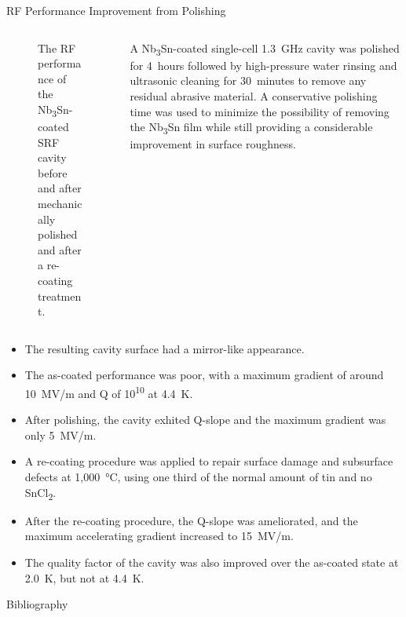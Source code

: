 \documentclass{beamer}
\begin{document}
\begin{frame}{}
\begin{columns}[t]
\begin{column}{0.32\textwidth}
\begin{block}{\label{sec:cavitycbp}RF Performance Improvement from Polishing}
\begin{columns}
\begin{column}{0.45\columnwidth}
\begin{figure}[t]
                                \caption{\label{fig:vtstestgraph}The RF performance of the Nb\textsubscript{3}Sn-coated SRF cavity before and after mechanically polished and after a re-coating treatment.}
                            \end{figure}
                        \end{column}
                        \begin{column}{0.5\columnwidth}
                            A Nb\textsubscript{3}Sn-coated single-cell 1.3~GHz cavity was polished for 4~hours followed by high-pressure water rinsing and ultrasonic cleaning for 30~minutes to remove any residual abrasive material. A conservative polishing time was used to minimize the possibility of removing the Nb\textsubscript{3}Sn film while still providing a considerable improvement in surface roughness.
                        \end{column}
                    \end{columns}   
                    \begin{itemize}
                        \item The resulting cavity surface had a mirror-like appearance.
                        \item The as-coated performance was poor, with a maximum gradient of around 10~MV/m and Q of 10\textsuperscript{10} at 4.4~K.
                        \item After polishing, the cavity exhited Q-slope and the maximum gradient was only 5~MV/m.
                        \item A re-coating procedure was applied to repair surface damage and subsurface defects at 1,000~°C, using one third of the normal amount of tin and no SnCl\textsubscript{2}.
                        \item After the re-coating procedure, the Q-slope was ameliorated, and the maximum accelerating gradient increased to 15~MV/m.
                        \item The quality factor of the cavity was also improved over the as-coated state at 2.0~K, but not at 4.4~K.
                    \end{itemize} 
                \end{block}
                \begin{block}{\label{sec:bibliography}Bibliography}
                    \small
                    
                    
                \end{block}

\end{column}
\end{columns}
\end{frame}
\end{document}
